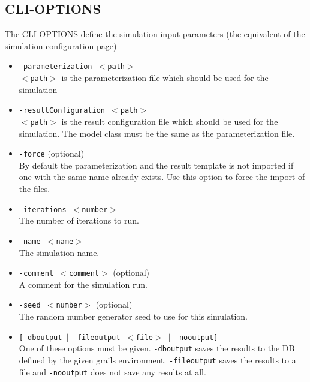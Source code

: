\subsection{CLI-OPTIONS}

The CLI-OPTIONS define the simulation input parameters (the equivalent of the simulation configuration page)

\begin{itemize}
	\item \texttt{-parameterization $<$path$>$ \\ $<$path$>$} is the parameterization file which should be used for the simulation
	\item \texttt{-resultConfiguration $<$path$>$ \\ $<$path$>$} is the result configuration file which should be used for the simulation. The model class must be the same as the parameterization file.
	\item \texttt{-force} (optional) \\ By default the parameterization and the result template is not imported if one with the same name already exists. Use this option to force the import of the files.
	\item \texttt{-iterations $<$number$>$} \\ The number of iterations to run.
	\item \texttt{-name $<$name$>$} \\ The simulation name.
	\item \texttt{-comment $<$comment$>$} (optional) \\ A comment for the simulation run.
	\item \texttt{-seed $<$number$>$} (optional) \\ The random number generator seed to use for this simulation.
	\item \texttt{[-dboutput $\mid$ -fileoutput $<$file$>$ $\mid$ -nooutput]} \\ One of these options must be given. \texttt{-dboutput} saves the results to the DB defined by the given grails environment. \texttt{-fileoutput} saves the results to a file and \texttt{-nooutput} does not save any results at all.
	
\end{itemize}
